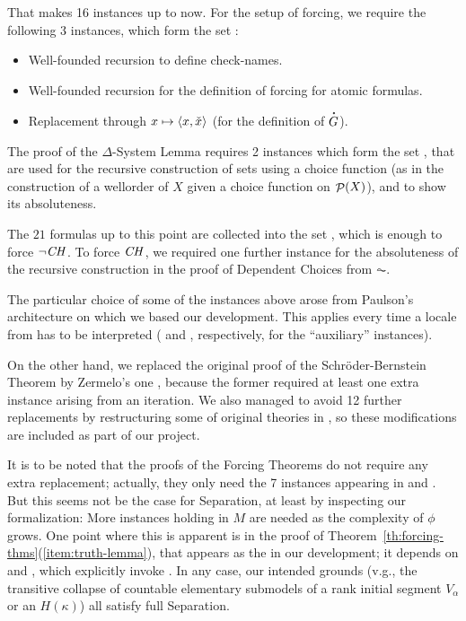 That makes 16 instances up to now. For the setup of forcing, we
require the following 3 instances, which form the set
:
%
\begin{itemize}
\item Well-founded recursion to define check-names.
\item Well-founded recursion for the definition of forcing for atomic formulas.
\item Replacement through $x\mapsto \langle x,\check{x}\rangle$ (for the
  definition of $\punto{G}$).
\end{itemize}
The proof of the $\Delta$-System Lemma requires 2 instances which form the set
, that are
used for the recursive construction of sets using a choice function (as in the
construction of a wellorder of $X$ given a choice function on
$\mathop{\mathcal{P}}(X)$), and to show its absoluteness.

The $21$ formulas up to this point are collected into the set
, which is enough to
force $\neg\mathit{CH}$. To force $\mathit{CH}$, we required one further instance for
the absoluteness of the recursive construction in the proof of
Dependent Choices from $\AC$.
  
The particular choice of some of the instances above arose from
Paulson's architecture on which we based our development.
This applies every time
a locale from  has to be
interpreted ( and
, respectively, for the “auxiliary” instances).

On the other hand, we replaced the original proof of the
Schröder-Bernstein Theorem by Zermelo's one
\cite[Exr. x4.27]{moschovakis1994notes}, because the former required
at least one extra instance
arising from an iteration. We also managed to avoid 12 further
replacements by restructuring some of original theories in
, so these modifications are included as
part of our project.

It is to be noted that the proofs of the Forcing Theorems do not
require any extra replacement; actually, they only need the 7
instances appearing in  and
.  But this seems not be
the case for Separation, at least by inspecting our formalization:
More instances holding in $M$ are needed 
as the complexity of $\phi$ grows. One point where this is apparent is
in the proof of Theorem~\ref{th:forcing-thms}(\ref{item:truth-lemma}),
that appears as the  in our development; it
depends on  and
, which explicitly invoke
. In any case, our intended grounds
(v.g., the transitive collapse of countable elementary submodels of a
rank initial segment $V_\alpha$ or an $H(\kappa)$) all satisfy full
Separation.


